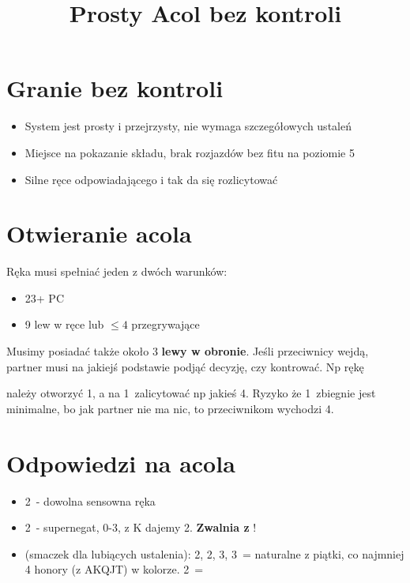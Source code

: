 \documentclass[12pt, a4paper]{article}
\author{}
\date{}
\title{Prosty Acol bez kontroli}
\begin{document}
\maketitle
\section{Granie bez kontroli}
\begin{itemize}
    \item System jest prosty i przejrzysty, nie wymaga szczegółowych ustaleń
    \item Miejsce na pokazanie składu, brak rozjazdów bez fitu na poziomie 5
    \item Silne ręce odpowiadającego i tak da się rozlicytować
\end{itemize}

\section{Otwieranie acola}
Ręka musi spełniać jeden z dwóch warunków:
\begin{itemize}
    \item 23+ PC
    \item 9 lew w ręce lub $\leq 4$ przegrywające
\end{itemize}

Musimy posiadać także około 3 \textbf{lewy w obronie}. Jeśli przeciwnicy wejdą, partner musi 
na jakiejś podstawie podjąć decyzję, czy kontrować. Np rękę
\begin{center}
\end{center}
należy otworzyć 1\spades, a na 1\nt\ zalicytować np jakieś 4\hearts. Ryzyko że 1\spades\ zbiegnie jest minimalne,
bo jak partner nie ma nic, to przeciwnikom wychodzi 4\hearts.

\section{Odpowiedzi na acola}
\begin{itemize}
    \item 2\diams\ - dowolna sensowna ręka
    \item 2\hearts\ - supernegat, 0-3\hcp, z K dajemy 2\diams. \textbf{Zwalnia z \gf}!
    \item (smaczek dla lubiących ustalenia): 2\spades, 2\nt, 3\clubs, 3\diams\ = naturalne z piątki,
    co najmniej 4 honory (z AKQJT) w kolorze. 2\nt\ = \hearts
\end{itemize}
\end{document}
